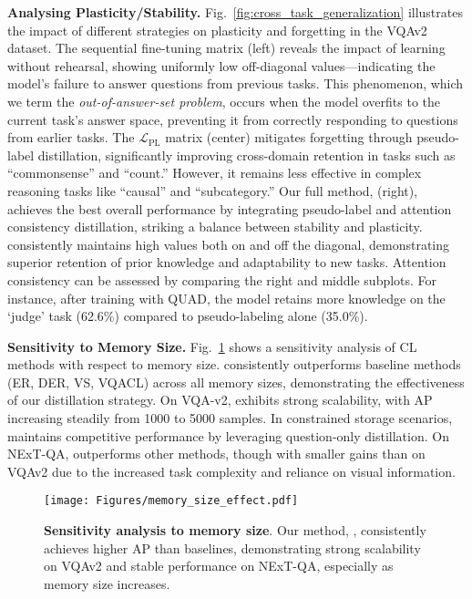 \noindent {} \textbf{Analysing Plasticity/Stability. }Fig.~\ref{fig:cross_task_generalization} illustrates the impact of different strategies on plasticity and forgetting in the VQAv2 dataset. The sequential fine-tuning matrix (left) reveals the impact of learning without rehearsal, showing uniformly low off-diagonal values—indicating the model's failure to answer questions from previous tasks. This phenomenon, which we term the \textit{out-of-answer-set problem}, occurs when the model overfits to the current task’s answer space, preventing it from correctly responding to questions from earlier tasks. The $\mathcal{L}_{\text{PL}}$ matrix (center) mitigates forgetting through pseudo-label distillation, significantly improving cross-domain retention in tasks such as ``commonsense'' and ``count.'' However, it remains less effective in complex reasoning tasks like ``causal'' and ``subcategory.'' Our full method, \qstmethodshort{} (right), achieves the best overall performance by integrating pseudo-label and attention consistency distillation, striking a balance between stability and plasticity. \qstmethodshort{} consistently maintains high values both on and off the diagonal, demonstrating superior retention of prior knowledge and adaptability to new tasks. Attention consistency can be assessed by comparing the right and middle subplots. For instance, after training with QUAD, the model retains more knowledge on the `judge' task (62.6\%) compared to pseudo-labeling alone (35.0\%).

\noindent {} \textbf{Sensitivity to Memory Size. }Fig.~\ref{fig:memory_size_comparison} shows a sensitivity analysis of CL methods with respect to memory size. \qstmethodshort{} consistently outperforms baseline methods (ER, DER, VS, VQACL) across all memory sizes, demonstrating the effectiveness of our distillation strategy. On VQA-v2, \qstmethodshort{} exhibits strong scalability, with AP increasing steadily from 1000 to 5000 samples. In constrained storage scenarios, \qstmethodshort{} maintains competitive performance by leveraging question-only distillation. On NExT-QA, \qstmethodshort{} outperforms other methods, though with smaller gains than on VQAv2 due to the increased task complexity and reliance on visual information.
\begin{figure}[t]
\centering
        \texttt{[image: Figures/memory\_size\_effect.pdf]}
        \caption{\textbf{Sensitivity analysis to memory size}. Our method, \qstmethodshort{}, consistently achieves higher AP than baselines, demonstrating strong scalability on VQAv2 and stable performance on NExT-QA, especially as memory size increases.}
        \label{fig:memory_size_comparison}
\end{figure}

